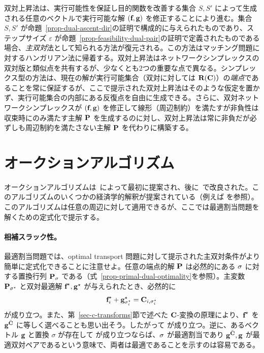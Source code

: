 双対上昇法は、実行可能性を保証し目的関数を改善する集合 $S,S'$ によって生成される任意のベクトルで実行可能な解 $(\fD,\gD)$ を修正することにより進む。集合 $S,S'$ が命題~\ref{prop-dual-ascent-dir}の証明で構成的に与えられたものであり、ステップサイズ $\varepsilon$ が命題~\ref{prop-feasibility-dual-pair}の証明で定義されたものである場合、\emph{主双対}法として知られる方法が復元される。この方法はマッチング問題に対するハンガリアン法に帰着する。双対上昇法はネットワークシンプレックスの双対版と類似点を共有するが、少なくとも2つの重要な点で異なる。シンプレックス型の方法は、現在の解が実行可能集合（双対に対しては $\PotentialsD(\C)$）の\emph{端点}であることを常に保証するが、ここで提示された双対上昇法はそのような仮定を置かず、実行可能集合の内部にある反復点を自由に生成できる。さらに、双対ネットワークシンプレックスが $(\fD,\gD)$ を修正して線形（周辺制約）を満たすが非負性は収束時にのみ満たす主解 $\P$ を生成するのに対し、双対上昇法は常に非負だが必ずしも周辺制約を満たさない主解 $\P$ を代わりに構築する。

\section{オークションアルゴリズム}\label{s-auction}
オークションアルゴリズムは~\citet{bertsekas1981new}によって最初に提案され、後に~\citep{bertsekas1988dual}で改良された。このアルゴリズムのいくつかの経済学的解釈が提案されている（例えば \citet{bertsekas1992auction}を参照）。このアルゴリズムは任意の周辺に対して適用できるが、ここでは最適割当問題を解くための定式化で提示する。

\paragraph{相補スラック性。} 最適割当問題では、optimal transport 問題に対して提示された主双対条件がより簡単に定式化できることに注意せよ。任意の端点的解 $\P$ は必然的にある $\si$ に対する置換行列 $\P_\si$ である（式~\eqref{prop-primal-dual-optimality}を参照）。主変数 $\P_{\si^\star}$ と双対最適解 $\fD^\star,\gD^\star$ が与えられたとき、必然的に
$$
\fD^\star_i + \gD^\star_{\si^\star_i} = \C_{i,{\si_i^\star}}
$$
が成り立つ。また、第~\ref{sec-c-transforms}節で述べた $\C$-変換の原理により、$\fD^\star$ を $\gD^{\bar\C}$ に等しく選べることも思い出そう。したがって
が成り立つ。逆に、あるベクトル $\gD$ と置換 $\sigma$ が存在して
が成り立つならば、$\si$ が最適割当であり $\gD^{\bar\C},\gD$ が最適双対ペアであるという意味で、両者は最適であることを示すのは容易である。


